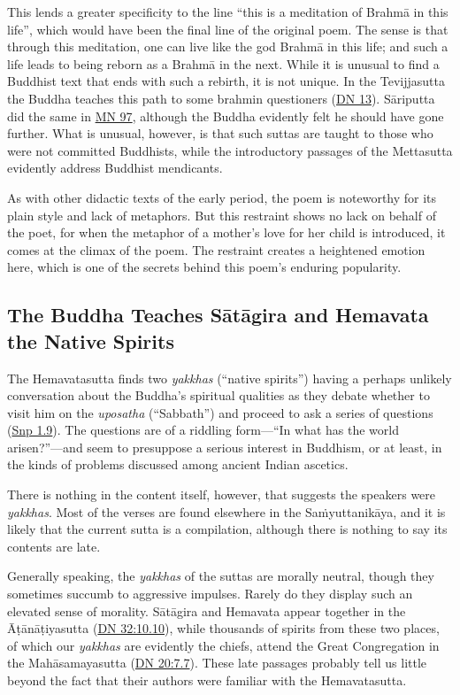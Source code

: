 \documentclass[12pt,openany]{book}%
\begin{document}
This lends a greater specificity to the line “this is a meditation of \textsanskrit{Brahmā} in this life”, which would have been the final line of the original poem. The sense is that through this meditation, one can live like the god \textsanskrit{Brahmā} in this life; and such a life leads to being reborn as a \textsanskrit{Brahmā} in the next. While it is unusual to find a Buddhist text that ends with such a rebirth, it is not unique. In the Tevijjasutta the Buddha teaches this path to some brahmin questioners (\href{https://suttacentral.net/dn13/en/sujato}{DN 13}). \textsanskrit{Sāriputta} did the same in \href{https://suttacentral.net/mn97/en/sujato}{MN 97}, although the Buddha evidently felt he should have gone further. What is unusual, however, is that such suttas are taught to those who were not committed Buddhists, while the introductory passages of the Mettasutta evidently address Buddhist mendicants.

As with other didactic texts of the early period, the poem is noteworthy for its plain style and lack of metaphors. But this restraint shows no lack on behalf of the poet, for when the metaphor of a mother’s love for her child is introduced, it comes at the climax of the poem. The restraint creates a heightened emotion here, which is one of the secrets behind this poem’s enduring popularity.

\subsection*{The Buddha Teaches \textsanskrit{Sātāgira} and Hemavata the Native Spirits}

The Hemavatasutta finds two \textit{yakkhas} (“native spirits”) having a perhaps unlikely conversation about the Buddha’s spiritual qualities as they debate whether to visit him on the \textit{uposatha} (“Sabbath”) and proceed to ask a series of questions (\href{https://suttacentral.net/snp1.9/en/sujato}{Snp 1.9}). The questions are of a riddling form—“In what has the world arisen?”—and seem to presuppose a serious interest in Buddhism, or at least, in the kinds of problems discussed among ancient Indian ascetics.

There is nothing in the content itself, however, that suggests the speakers were \textit{yakkhas}. Most of the verses are found elsewhere in the \textsanskrit{Saṁyuttanikāya}, and it is likely that the current sutta is a compilation, although there is nothing to say its contents are late.

Generally speaking, the \textit{yakkhas} of the suttas are morally neutral, though they sometimes succumb to aggressive impulses. Rarely do they display such an elevated sense of morality. \textsanskrit{Sātāgira} and Hemavata appear together in the \textsanskrit{Āṭānāṭiyasutta} (\href{https://suttacentral.net/dn32/en/sujato\#10.10}{DN 32:10.10}), while thousands of spirits from these two places, of which our \textit{yakkhas} are evidently the chiefs, attend the Great Congregation in the \textsanskrit{Mahāsamayasutta} (\href{https://suttacentral.net/dn20/en/sujato\#7.7}{DN 20:7.7}). These late passages probably tell us little beyond the fact that their authors were familiar with the Hemavatasutta.
\end{document}
